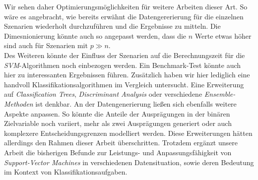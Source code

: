 \documentclass[
]{article}
\begin{document}
Wir sehen daher Optimierungsmöglichkeiten für weitere Arbeiten dieser
Art. So wäre es angebracht, wie bereits erwähnt die Datengererierung für
die einzelnen Szenarien wiederholt durchzuführen und die Ergebnisse zu
mitteln. Die Dimesnionierung könnte auch so angepasst werden, dass die
\(n\) Werte etwas höher sind auch für Szenarien mit \(p \gg n\).\\
Des Weiteren könnte der Einfluss der Szenarien auf die Berechnungszeit
für die \textit{SVM}-Algorithmen noch einbezogen werden. Ein
Benchmark-Test könnte auch hier zu interessanten Ergebnissen führen.
Zusätzlich haben wir hier lediglich eine handvoll
Klassifikationsalgorithmen im Vergleich untersucht. Eine Erweiterung auf
\textit{Classification Trees}, \textit{Discriminant Analysis} oder
verschiedene \textit{Ensemble-Methoden} ist denkbar. An der
Datengenerierung ließen sich ebenfalls weitere Aspekte anpassen. So
könnte die Anteile der Ausprägungen in der binären Zielvariable noch
variiert, mehr als zwei Ausprägungen generiert oder auch komplexere
Entscheidungsgrenzen modelliert werden. Diese Erweiterungen hätten
allerdings den Rahmen dieser Arbeit überschritten. Trotzdem ergänzt
unsere Arbeit die bisherigen Befunde zur Leistungs- und
Anpassungsfähigkeit von \textit{Support-Vector Machines} in
verschiedenen Datensituation, sowie deren Bedeutung im Kontext von
Klassifikationsaufgaben. \newpage


\printbibliography
\end{document}
